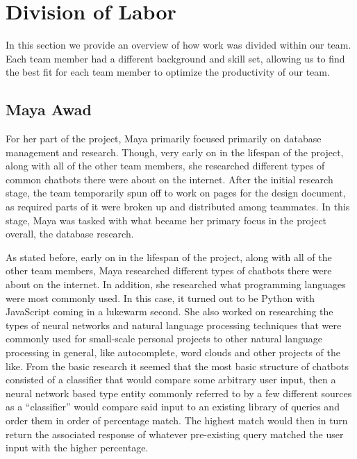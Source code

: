 \documentclass[titlepage, 12pt]{article}
\begin{document}
\pagebreak





\section{Division of Labor}

In this section we provide an overview of how work was divided within our team. Each team member had a different background and skill set, allowing us to find the best fit for each team member to optimize the productivity of our team.

\subsection{Maya Awad}

For her part of the project, Maya primarily focused primarily on database management and research. Though, very early on in the lifespan of the project, along with all of the other team members, she researched different types of common chatbots there were about on the internet. After the initial research stage, the team temporarily spun off to work on pages for the design document, as required parts of it were broken up and distributed among teammates. In this stage, Maya was tasked with what became her primary focus in the project overall, the database research.

As stated before, early on in the lifespan of the project, along with all of the other team members, Maya researched different types of chatbots there were about on the internet. In addition, she researched what programming languages were most commonly used. In this case, it turned out to be Python with JavaScript coming in a lukewarm second. She also worked on researching the types of neural networks and natural language processing techniques that were commonly used for small-scale personal projects to other natural language processing in general, like autocomplete, word clouds and other projects of the like. From the basic research it seemed that the most basic structure of chatbots consisted of a classifier that would compare some arbitrary user input, then a neural network based type entity commonly referred to by a few different sources as a “classifier” would compare said input to an existing library of queries and order them in order of percentage match. The highest match would then in turn return the associated response of whatever pre-existing query matched the user input with the higher percentage.
\end{document}
